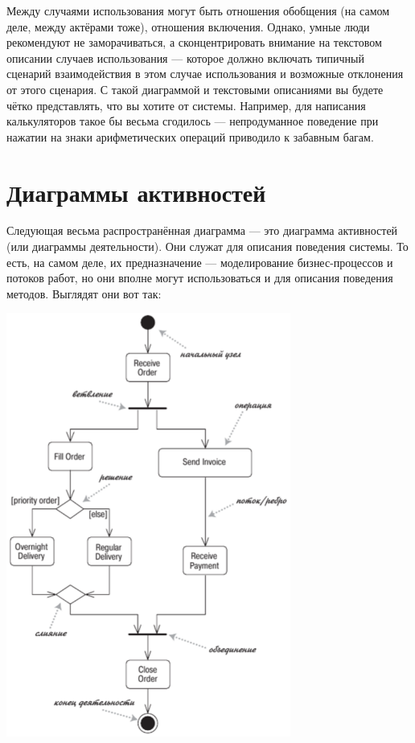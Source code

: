 \documentclass{../../text-style}
\begin{document}
Между случаями использования могут быть отношения обобщения (на самом деле, между актёрами тоже), отношения включения. Однако, умные люди рекомендуют не заморачиваться, а сконцентрировать внимание на текстовом описании случаев использования --- которое должно включать типичный сценарий взаимодействия в этом случае использования и возможные отклонения от этого сценария. С такой диаграммой и текстовыми описаниями вы будете чётко представлять, что вы хотите от системы. Например, для написания калькуляторов такое бы весьма сгодилось --- непродуманное поведение при нажатии на знаки арифметических операций приводило к забавным багам.

\section{Диаграммы активностей}

Следующая весьма распространённая диаграмма --- это диаграмма активностей (или диаграммы деятельности). Они служат для описания поведения системы. То есть, на самом деле, их предназначение --- моделирование бизнес-процессов и потоков работ, но они вполне могут использоваться и для описания поведения методов. Выглядят они вот так:

\begin{center}
    \includegraphics[width=0.7\textwidth]{activityDiagram.png}
\end{center}
\end{document}
